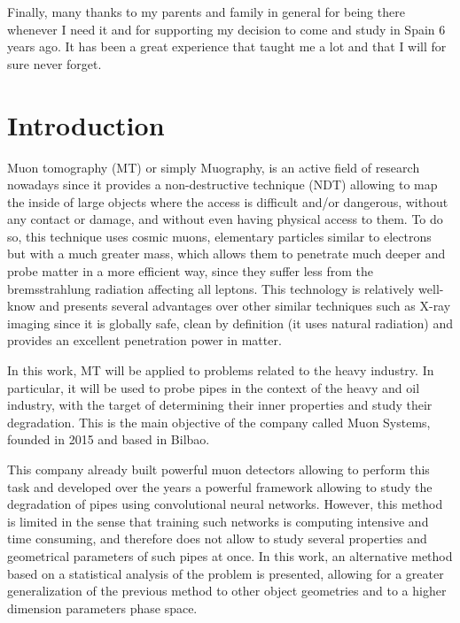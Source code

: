 \documentclass[a4paper, 11pt]{report}
\begin{document}
Finally, many thanks to my parents and family in general for being there whenever I need it and for supporting my decision to come and study in Spain 6 years ago. It has been a great experience that taught me a lot and that I will for sure never forget.  


\newpage


\tableofcontents

\thispagestyle{empty}
\newpage



\chapter{Introduction}

Muon tomography (MT) or simply Muography, is an active field of research nowadays since it provides a non-destructive technique (NDT) allowing to map the inside of large objects where the access is difficult and/or dangerous, without any contact or damage, and without even having physical access to them. To do so, this technique uses cosmic muons, elementary particles similar to electrons but with a much greater mass, which allows them to penetrate much deeper and probe matter in a more efficient way, since they suffer less from the bremsstrahlung radiation affecting all leptons. This technology is relatively well-know and presents several advantages over other similar techniques such as X-ray imaging since it is globally safe, clean by definition (it uses natural radiation) and provides an excellent penetration power in matter.

In this work, MT will be applied to problems related to the heavy industry. In particular, it will be used to probe pipes in the context of the heavy and oil industry, with the target of determining their inner properties and study their degradation. This is the main objective of the company called Muon Systems, founded in 2015 and based in Bilbao.

This company already built powerful muon detectors allowing to perform this task and developed over the years a powerful framework allowing to study the degradation of pipes using convolutional neural networks. However, this method is limited in the sense that training such networks is computing intensive and time consuming, and therefore does not allow to study several properties and geometrical parameters of such pipes at once. In this work, an alternative method based on a statistical analysis of the problem is presented, allowing for a greater generalization of the previous method to other object geometries and to a higher dimension parameters phase space.
\end{document}
